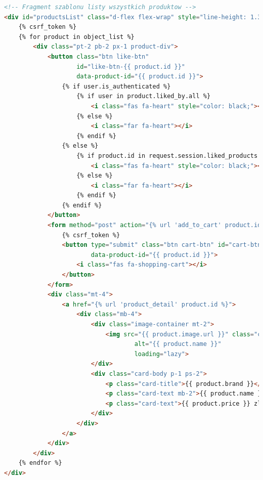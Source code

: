 \documentclass[12pt,a4paper,oneside]{article}
\theoremstyle{definition}
\numberwithin{equation}{section}
\begin{document}
\begin{itemize}
        \begin{lstlisting}[language=HTML, caption=Szablon \texttt{all\_products.html}]
<!-- Fragment szablonu listy wszystkich produktow -->
<div id="productsList" class="d-flex flex-wrap" style="line-height: 1.3;">
    {% csrf_token %}
    {% for product in object_list %}
        <div class="pt-2 pb-2 px-1 product-div">
            <button class="btn like-btn"
                    id="like-btn-{{ product.id }}"
                    data-product-id="{{ product.id }}">
                {% if user.is_authenticated %}
                    {% if user in product.liked_by.all %}
                        <i class="fas fa-heart" style="color: black;"></i>
                    {% else %}
                        <i class="far fa-heart"></i>
                    {% endif %}
                {% else %}
                    {% if product.id in request.session.liked_products %}
                        <i class="fas fa-heart" style="color: black;"></i>
                    {% else %}
                        <i class="far fa-heart"></i>
                    {% endif %}
                {% endif %}
            </button>
            <form method="post" action="{% url 'add_to_cart' product.id %}" class="d-inline">
                {% csrf_token %}
                <button type="submit" class="btn cart-btn" id="cart-btn-{{ product.id }}"
                        data-product-id="{{ product.id }}">
                    <i class="fas fa-shopping-cart"></i>
                </button>
            </form>
            <div class="mt-4">
                <a href="{% url 'product_detail' product.id %}">
                    <div class="mb-4">
                        <div class="image-container mt-2">
                            <img src="{{ product.image.url }}" class="card-img-top"
                                    alt="{{ product.name }}"
                                    loading="lazy">
                        </div>
                        <div class="card-body p-1 ps-2">
                            <p class="card-title">{{ product.brand }}</p>
                            <p class="card-text mb-2">{{ product.name }}</p>
                            <p class="card-text">{{ product.price }} zl</p>
                        </div>
                    </div>
                </a>
            </div>
        </div>
    {% endfor %}
</div>
            \end{lstlisting}
\end{itemize}
\end{document}
